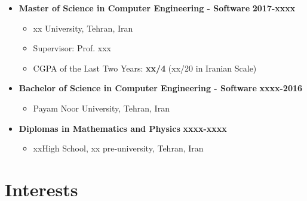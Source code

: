 \documentclass[10pt]{article} %
\begin{document}
\begin{itemize}
    \item \textbf{Master of Science in Computer Engineering - Software}
    \hfill \textbf {2017-xxxx} 
    \begin{itemize}
        \item xx University, Tehran, Iran
        \item Supervisor: Prof. xxx
        \item CGPA of the Last Two Years:\textbf{ xx/4 }(xx/20 in Iranian Scale)
    \end{itemize}
\end{itemize}
  \hfill   \hfill 
\begin{itemize}
    \item \textbf{Bachelor of Science in Computer Engineering - Software}
    \hfill \textbf {xxxx-2016} 
    \begin{itemize}
        \item Payam Noor University, Tehran, Iran
    \end{itemize}
\end{itemize}
  \hfill   \hfill 
\begin{itemize}
    \item \textbf{Diplomas in Mathematics and Physics}
    \hfill \textbf {xxxx-xxxx} 
    \begin{itemize}
        \item xxHigh School, xx pre-university, Tehran, Iran
    \end{itemize}
\end{itemize}


\section{Interests}


\end{document}
